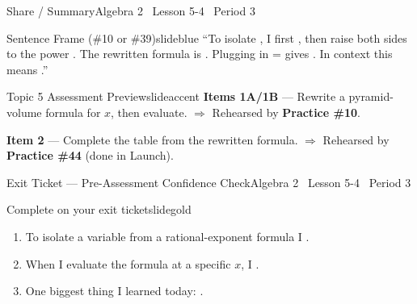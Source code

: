 \documentclass[aspectratio=169, 11pt]{beamer}
\begin{document}
\begin{frame}{Share / Summary}{Algebra 2 \textperiodcentered\ Lesson 5-4 \textperiodcentered\ Period 3}
\vspace{0.15cm}
\begin{projcard}{Sentence Frame (\#10 or \#39)}{slideblue}
\small
``To isolate \underline{\hspace{0.7cm}}, I first \underline{\hspace{1cm}}, then raise both sides to the power
\underline{\hspace{0.7cm}}. The rewritten formula is \underline{\hspace{1cm}}.
Plugging in \underline{\hspace{0.5cm}} = \underline{\hspace{0.5cm}} gives \underline{\hspace{0.7cm}}.
In context this means \underline{\hspace{1.2cm}}.''
\end{projcard}
\vspace{-0.1cm}
\begin{projcard}{Topic 5 Assessment Preview}{slideaccent}
\small
\textcolor{slideaccent}{\bfseries Items 1A/1B} --- Rewrite a pyramid-volume formula for \(x\), then evaluate.
\(\Rightarrow\) Rehearsed by \textbf{Practice \#10}.

\textcolor{slideaccent}{\bfseries Item 2} --- Complete the table from the rewritten formula.
\(\Rightarrow\) Rehearsed by \textbf{Practice \#44} (done in Launch).
\end{projcard}
\end{frame}

\begin{frame}{Exit Ticket --- Pre-Assessment Confidence Check}{Algebra 2 \textperiodcentered\ Lesson 5-4 \textperiodcentered\ Period 3}
\vspace{0.2cm}
\begin{projcard}{Complete on your exit ticket}{slidegold}
\begin{enumerate}
  \setlength{\itemsep}{0.25cm}
  \item To isolate a variable from a rational-exponent formula I \underline{\hspace{4cm}}.
  \item When I evaluate the formula at a specific \(x\), I \underline{\hspace{4cm}}.
  \item One biggest thing I learned today: \underline{\hspace{4.5cm}}.
\end{enumerate}
\end{projcard}
\end{frame}
\end{document}
